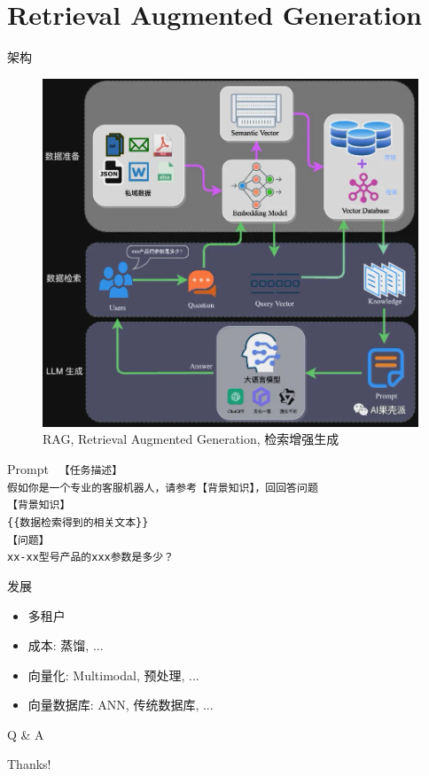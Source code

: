 \documentclass{beamer}
\begin{document}
\section{Retrieval Augmented Generation}

\begin{frame}{架构}
    \begin{figure}[c]
        \centering
        \includegraphics[height=.75\textheight]{pic/1.png}
        \caption{RAG, Retrieval Augmented Generation, 检索增强生成}
    \end{figure}
\end{frame}

\begin{frame}{Prompt}
    \tt
    【任务描述】\\
    假如你是一个专业的客服机器人，请参考【背景知识】，回回答问题 \\
    【背景知识】\\
    \{\{数据检索得到的相关文本\}\} \\
    【问题】\\
    xx-xx型号产品的xxx参数是多少？\\
\end{frame}

\begin{frame}{发展}
    \begin{itemize}
        \item 多租户
        \item 成本: 蒸馏, ...
        \item 向量化: Multimodal, 预处理, ...
        \item 向量数据库: ANN, 传统数据库, ...
    \end{itemize}
\end{frame}

\begin{frame}{Q \& A}
    \begin{center}
        {\Huge\calligra Thanks!}
    \end{center}
\end{frame}
\end{document}
